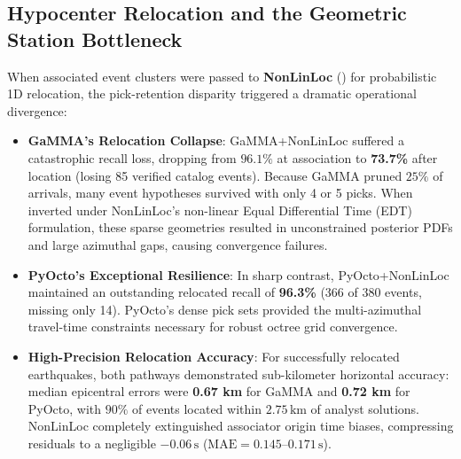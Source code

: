 \subsection{Hypocenter Relocation and the Geometric Station Bottleneck}
When associated event clusters were passed to \textbf{NonLinLoc}
(\cite{NonLinLoc}) for probabilistic 1D relocation, the
pick-retention disparity triggered a dramatic operational divergence:
\begin{itemize}
  \item \textbf{GaMMA's Relocation Collapse}: GaMMA+NonLinLoc
    suffered a catastrophic recall loss, dropping from $96.1\%$ at
    association to \textbf{73.7\%} after location (losing 85
    verified catalog events). Because \ac{GaMMA} pruned $25\%$ of
    arrivals, many event hypotheses survived with only 4 or 5 picks.
    When inverted under \ac{NonLinLoc}'s non-linear Equal Differential
    Time (\ac{EDT}) formulation, these sparse geometries resulted in
    unconstrained posterior PDFs and large azimuthal gaps, causing
    convergence failures.
  \item \textbf{PyOcto's Exceptional Resilience}: In sharp contrast,
    PyOcto+NonLinLoc maintained an outstanding relocated recall of
    \textbf{96.3\%} (366 of 380 events, missing only 14). PyOcto's
    dense pick sets provided the multi-azimuthal travel-time
    constraints necessary for robust octree grid convergence.
  \item \textbf{High-Precision Relocation Accuracy}: For
    successfully relocated earthquakes, both pathways demonstrated
    sub-kilometer horizontal accuracy: median epicentral errors were
    \textbf{0.67 km} for GaMMA and \textbf{0.72 km} for PyOcto, with
    $90\%$ of events located within $2.75\,\unit{\kilo\meter}$ of
    analyst solutions. NonLinLoc completely extinguished associator
    origin time biases, compressing residuals to a negligible
    $-0.06\,\unit{\second}$ ($\mathrm{MAE} =
    0.145\text{--}0.171\,\unit{\second}$).
\end{itemize}

